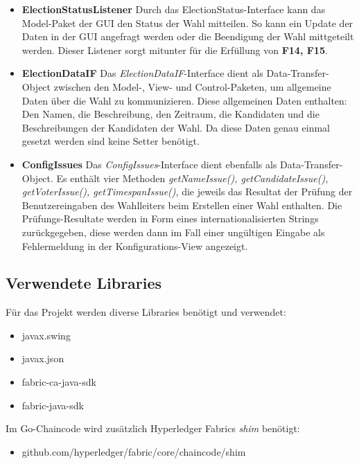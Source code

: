 \documentclass[parskip=full]{scrartcl}
\newcommand{\fakeparagraph}[1]{\textbf{#1}}
\begin{document}
\begin{itemize}
	\item\fakeparagraph{ElectionStatusListener} Durch das ElectionStatus-Interface kann das Model-Paket der GUI den Status der Wahl mitteilen. So kann ein Update der Daten in der GUI angefragt werden oder die Beendigung der Wahl mittgeteilt werden.
	Dieser Listener sorgt mitunter für die Erfüllung von \textbf{F14, F15}.

	\item\fakeparagraph{ElectionDataIF} Das \textit{ElectionDataIF}-Interface dient als Data-Transfer-Object zwischen den Model-, View- und Control-Paketen, um allgemeine Daten über die Wahl zu kommunizieren. Diese allgemeinen Daten enthalten: Den Namen, die Beschreibung, den Zeitraum, die Kandidaten und die Beschreibungen der Kandidaten der Wahl. Da diese Daten genau einmal gesetzt werden sind keine Setter benötigt.

	\item\fakeparagraph{ConfigIssues} Das \textit{ConfigIssues}-Interface dient ebenfalls als Data-Transfer-Object.
	 Es enthält vier Methoden \textit{getNameIssue(), getCandidateIssue(), getVoterIssue(), getTimespanIssue()}, die jeweils das Resultat der Prüfung der Benutzereingaben des Wahlleiters beim Erstellen einer Wahl enthalten. Die Prüfungs-Resultate werden in Form eines internationalisierten Strings zurückgegeben, diese werden dann im Fall einer ungültigen Eingabe als Fehlermeldung in der Konfigurations-View angezeigt.

	\end{itemize}

	\subsection{Verwendete Libraries}
	Für das Projekt werden diverse Libraries benötigt und verwendet:
	\begin{itemize}
		\item javax.swing
		\item javax.json
		\item fabric-ca-java-sdk
		\item fabric-java-sdk
	\end{itemize}
	Im Go-Chaincode wird zusätzlich Hyperledger Fabrics \textit{shim} benötigt:
	\begin{itemize}
	\item github.com/hyperledger/fabric/core/chaincode/shim
	\end{itemize}
\end{document}
